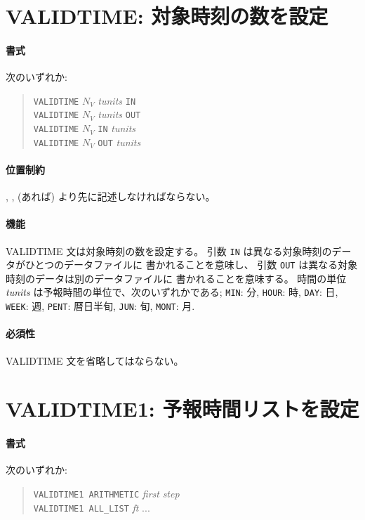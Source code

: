 \section{VALIDTIME: 対象時刻の数を設定}
\label{sec:def:VALIDTIME}
\paragraph{書式}
次のいずれか:
\begin{quote}
{\tt VALIDTIME} $N_V$ {\it tunits} {\tt IN}\\
{\tt VALIDTIME} $N_V$ {\it tunits} {\tt OUT}\\
{\tt VALIDTIME} $N_V$ {\tt IN} {\it tunits}\\
{\tt VALIDTIME} $N_V$ {\tt OUT} {\it tunits}\\
\end{quote}
\paragraph{位置制約}
,
,
 (あれば)
より先に記述しなければならない。
\paragraph{機能}
VALIDTIME 文は対象時刻の数を設定する。
引数 {\tt IN} は異なる対象時刻のデータがひとつのデータファイルに
書かれることを意味し、
引数 {\tt OUT} は異なる対象時刻のデータは別のデータファイルに
書かれることを意味する。
時間の単位 {\it tunits} は予報時間の単位で、次のいずれかである;
{\tt MIN}: 分,
{\tt HOUR}: 時,
{\tt DAY}: 日,
{\tt WEEK}: 週,
{\tt PENT}: 暦日半旬,
{\tt JUN}: 旬,
{\tt MONT}: 月.
\paragraph{必須性}
VALIDTIME 文を省略してはならない。

\section{VALIDTIME1: 予報時間リストを設定}
\label{sec:def:VALIDTIME1}
\paragraph{書式}
次のいずれか:
\begin{quote}
{\tt VALIDTIME1 ARITHMETIC} {\it first} {\it step} \\
{\tt VALIDTIME1 ALL\_LIST} {\it ft} ...
\end{quote}
